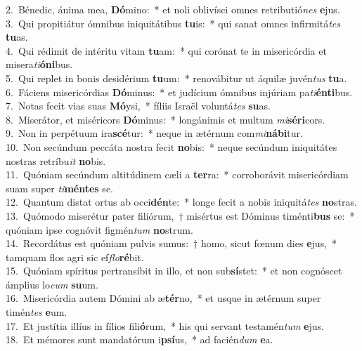 {2.~}Bénedic, ánima mea, \textbf{Dó}mino:~* et noli oblivísci omnes retributió\textit{nes} \textbf{e}jus.\\
{3.~}Qui propitiátur ómnibus iniquitátibus \textbf{tu}is:~* qui sanat omnes infirmitá\textit{tes} \textbf{tu}as.\\
{4.~}Qui rédimit de intéritu vitam \textbf{tu}am:~* qui corónat te in misericórdia et misera\textit{ti}\textbf{ó}\textbf{ni}bus.\\
{5.~}Qui replet in bonis desidérium \textbf{tu}um:~* renovábitur ut áquilæ juvén\textit{tus} \textbf{tu}a.\\
{6.~}Fáciens misericórdias \textbf{Dó}minus:~* et judícium ómnibus injúriam pa\textit{ti}\textbf{én}\textbf{ti}bus.\\
{7.~}Notas fecit vias suas \textbf{Mó}ysi,~* fíliis Israël voluntá\textit{tes} \textbf{su}as.\\
{8.~}Miserátor, et miséricors \textbf{Dó}minus:~* longánimis et multum \textit{mi}\textbf{sé}\textbf{ri}cors.\\
{9.~}Non in perpétuum ira\textbf{scé}tur:~* neque in ætérnum com\textit{mi}\textbf{ná}\textbf{bi}tur.\\
{10.~}Non secúndum peccáta nostra fecit \textbf{no}bis:~* neque secúndum iniquitátes nostras retríbu\textit{it} \textbf{no}bis.\\
{11.~}Quóniam secúndum altitúdinem cæli a \textbf{ter}ra:~* corroborávit misericórdiam suam super \textit{ti}\textbf{mén}\textbf{tes} se.\\
{12.~}Quantum distat ortus ab occi\textbf{dén}te:~* longe fecit a nobis iniquitá\textit{tes} \textbf{no}stras.\\
{13.~}Quómodo miserétur pater filiórum,~† misértus est Dóminus timénti\textbf{bus} se:~* quóniam ipse cognóvit figmén\textit{tum} \textbf{no}strum.\\
{14.~}Recordátus est quóniam pulvis sumus:~† homo, sicut fœnum dies \textbf{e}jus,~* tamquam flos agri sic ef\textit{flo}\textbf{ré}bit.\\
{15.~}Quóniam spíritus pertransíbit in illo, et non sub\textbf{sí}stet:~* et non cognóscet ámplius lo\textit{cum} \textbf{su}um.\\
{16.~}Misericórdia autem Dómini ab æ\textbf{tér}no,~* et usque in ætérnum super timén\textit{tes} \textbf{e}um.\\
{17.~}Et justítia illíus in fílios fili\textbf{ó}rum,~* his qui servant testamén\textit{tum} \textbf{e}jus.\\
{18.~}Et mémores sunt mandatórum i\textbf{psí}us,~* ad facién\textit{dum} \textbf{e}a.\\

